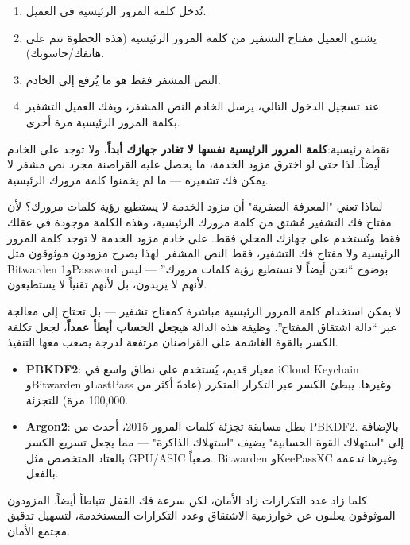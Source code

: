 \begin{enumerate}
  \item تُدخل كلمة المرور الرئيسية في العميل.
  \item يشتق العميل مفتاح التشفير من كلمة المرور الرئيسية (هذه الخطوة تتم على هاتفك/حاسوبك).
  \item النص المشفر فقط هو ما يُرفع إلى الخادم.
  \item عند تسجيل الدخول التالي، يرسل الخادم النص المشفر، ويفك العميل التشفير بكلمة المرور الرئيسية مرة أخرى.
\end{enumerate}

نقطة رئيسية:\textbf{كلمة المرور الرئيسية نفسها لا تغادر جهازك أبداً}، ولا توجد على الخادم أيضاً. لذا حتى لو اخترق مزود الخدمة، ما يحصل عليه القراصنة مجرد نص مشفر لا يمكن فك تشفيره — ما لم يخمنوا كلمة مرورك الرئيسية.

\begin{tcbinfo}{لماذا تعني "المعرفة الصفرية" أن مزود الخدمة لا يستطيع رؤية كلمات مرورك؟}
لأن مفتاح فك التشفير مُشتق من كلمة مرورك الرئيسية، وهذه الكلمة موجودة في عقلك فقط وتُستخدم على جهازك المحلي فقط. على خادم مزود الخدمة لا توجد كلمة المرور الرئيسية ولا مفتاح فك التشفير، فقط النص المشفر. لهذا يصرح مزودون موثوقون مثل Bitwarden و1Password بوضوح “نحن أيضاً لا نستطيع رؤية كلمات مرورك” — ليس لأنهم لا يريدون، بل لأنهم تقنياً لا يستطيعون.

\end{tcbinfo}


لا يمكن استخدام كلمة المرور الرئيسية مباشرة كمفتاح تشفير — بل تحتاج إلى معالجة عبر “دالة اشتقاق المفتاح”. وظيفة هذه الدالة هي\textbf{جعل الحساب أبطأ عمداً}، لجعل تكلفة الكسر بالقوة الغاشمة على القراصنان مرتفعة لدرجة يصعب معها التنفيذ.

\begin{itemize}
  \item \textbf{PBKDF2}: معيار قديم، يُستخدم على نطاق واسع في iCloud Keychain وBitwarden وLastPass وغيرها. يبطئ الكسر عبر التكرار المتكرر (عادةً أكثر من 100,000 مرة) للتجزئة.
  \item \textbf{Argon2}: بطل مسابقة تجزئة كلمات المرور 2015، أحدث من PBKDF2. بالإضافة إلى "استهلاك القوة الحسابية" يضيف "استهلاك الذاكرة" — مما يجعل تسريع الكسر بالعتاد المتخصص مثل GPU/ASIC صعباً. Bitwarden وKeePassXC وغيرها تدعمه بالفعل.
\end{itemize}

كلما زاد عدد التكرارات زاد الأمان، لكن سرعة فك القفل تتباطأ أيضاً. المزودون الموثوقون يعلنون عن خوارزمية الاشتقاق وعدد التكرارات المستخدمة، لتسهيل تدقيق مجتمع الأمان.

